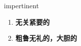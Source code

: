 
\begin{frame}
{\huge impertinent}
\begin{center}
\begin{enumerate}\Large
  \item \textbf{无关紧要的}
  \item \textbf{粗鲁无礼的，大胆的}
\end{enumerate}
\end{center}
\end{frame}
